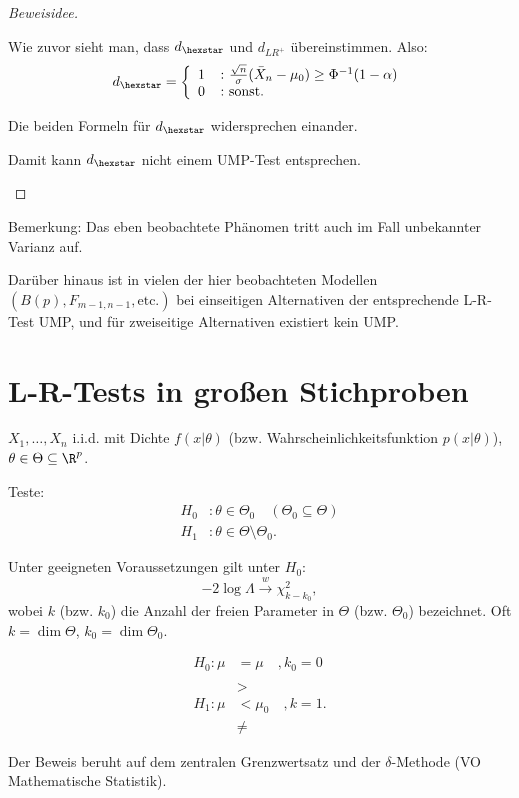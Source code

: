 \documentclass{tstextbook}
\begin{document}
\begin{proof}[Beweisidee]
\begin{itemize}
		Wie zuvor sieht man, dass $ d_{\hexstar} $ und $ d_{LR^+} $ übereinstimmen. 
			Also: 
		\[
			d_{\hexstar} = \left\{\begin{array}{ll}
				1 & \colon \frac{\sqrt{n}}{\sigma}(\bar{X}_n-\mu_0)\ge\Phi^{-1}(1-\alpha) \\
				0 & \colon \text{sonst}.
			\end{array}\right.
		\]
		
		Die beiden Formeln für $ d_{\hexstar} $ widersprechen einander. 
		
		Damit kann $ d_{\hexstar} $ nicht einem UMP-Test entsprechen.
	\end{itemize}
\end{proof}

\begin{remark}
	Bemerkung: Das eben beobachtete Phänomen tritt auch im Fall unbekannter Varianz auf. 
	
	Darüber hinaus ist in vielen der hier beobachteten Modellen $ (B(p), F_{m-1,n-1}, \text{etc.}) $ bei einseitigen Alternativen der entsprechende L-R-Test UMP, und für zweiseitige Alternativen existiert kein UMP.
\end{remark}


\section{L-R-Tests in großen Stichproben}

$ X_1,\ldots,X_n $ i.i.d. mit Dichte $ f(x|\theta) $ (bzw. Wahrscheinlichkeitsfunktion $ p(x|\theta) $), $ \theta\in\Theta\subseteq\R^p $. 

Teste: 
	\[\begin{aligned}
	H_0 &\colon \theta\in\Theta_0 \quad (\Theta_0\subseteq\Theta) \\
	H_1 &\colon \theta\in\Theta\setminus\Theta_0.
	\end{aligned}
	\]
	
\begin{satz}
	Unter geeigneten Voraussetzungen gilt unter $ H_0 $:
	\[
	-2\log\Lambda \xrightarrow{w} \chi^2_{k-k_0},
	\]
	wobei $ k $ (bzw. $ k_0 $) die Anzahl der freien Parameter in $ \Theta $ (bzw. $ \Theta_0 $) bezeichnet. Oft $ k = \dim \Theta $, $ k_0 = \dim \Theta_0 $. 
	
	\[
	\begin{aligned}
		H_0\colon \mu & = \mu \quad , k_0 = 0 \\ 
		& \\
		& > \\
		H_1\colon \mu & < \mu_0 \quad , k =1 .\\
		& \ne
	\end{aligned}
	\]
\end{satz}
Der Beweis beruht auf dem zentralen Grenzwertsatz und der $ \delta $-Methode (VO Mathematische Statistik).
\end{document}
